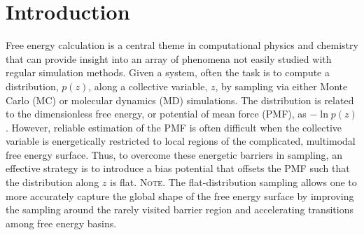 \documentclass[preprint, superscriptaddress, floatfix]{revtex4-1}
\newcommand{\note}[1]{{\color{DarkGreen}\footnotesize \textsc{Note.} #1}}
\begin{document}
\section{Introduction}



Free energy calculation\cite{frenkel, newman, *landau_binder} is a central theme
in computational physics and chemistry
that can provide insight into an array of phenomena not easily studied
with regular simulation methods.
%
Given a system,
often the task is to compute
a distribution, $p(z)$,
along a collective variable, $z$, by sampling via either
Monte Carlo (MC)\cite{frenkel, newman, *landau_binder}
or molecular dynamics (MD)\cite{frenkel, karplus2002}
simulations.
%
The distribution is related to
the dimensionless free energy, or potential of mean force (PMF),
as $-\ln p(z)$.
%
However, reliable estimation of the PMF is often difficult
when the collective variable is energetically restricted to local regions
of the complicated, multimodal free energy surface.
%
Thus,
to overcome these energetic barriers in sampling,
an effective strategy is to introduce
a bias potential\cite{torrie1974, *torrie1977}
that offsets the PMF
such that the distribution along $z$ is
flat.\cite{mezei1987, berg1992, *lee1993,
wang2001, wang2001pre,
huber1994,
*laio2002, *laio2008, *barducci2011, *sutto2012}
%
\note{The flat-distribution sampling
allows one to more accurately capture the
global shape of the free energy surface
by improving the sampling around the rarely visited barrier region
and accelerating transitions among free energy basins.}
\end{document}

